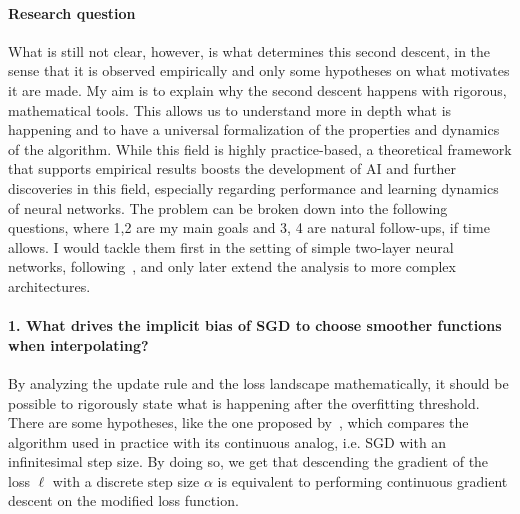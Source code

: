 \documentclass{amsart}
\begin{document}
\paragraph{Research question} 

What is still not clear, however, is what determines this second descent, in the sense that it is observed empirically and only some hypotheses on what motivates it are made. My aim is to explain why the second descent happens with rigorous, mathematical tools. 
This allows us to understand more in depth what is happening and to have a universal formalization of the properties and dynamics of the algorithm. While this field is highly practice-based, a theoretical framework that supports empirical results boosts the development of AI and further discoveries in this field, especially regarding performance and learning dynamics of neural networks.
The problem can be broken down into the following questions, where 1,2 are my main goals and 3, 4 are natural follow-ups, if time allows. I would tackle them first in the setting of simple two-layer neural networks, following~\cite{belkin}, and only later extend the analysis to more complex architectures.

\paragraph{\bf 1. What drives the implicit bias of SGD to choose smoother functions when interpolating?}
By analyzing the update rule and the loss landscape mathematically, it should be possible to rigorously state what is happening after the overfitting threshold. There are some hypotheses, like the one proposed by~\cite{prince}, which compares the algorithm used in practice with its continuous analog, i.e. SGD with an infinitesimal step size. By doing so, we get that descending the gradient of the loss $\ell$ with a discrete step size $\alpha$ is equivalent to performing continuous gradient descent on the modified loss function.
\end{document}
